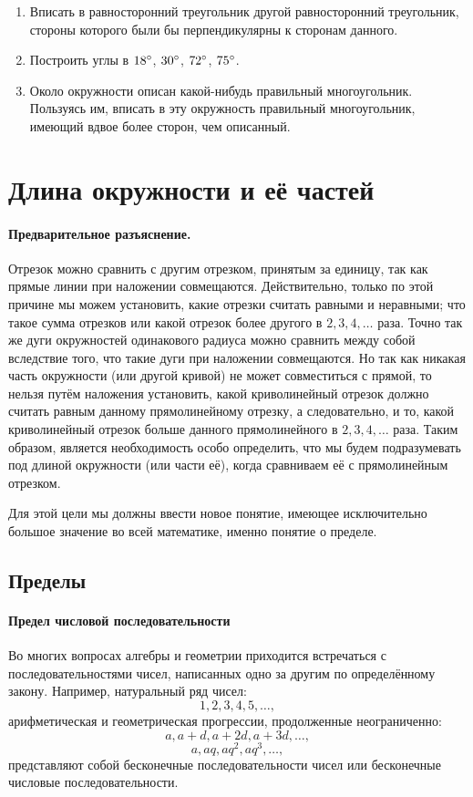 \documentclass[twoside]{book}
\begin{document}
\begin{enumerate}
 \item
Вписать в равносторонний треугольник другой равносторонний треугольник, стороны которого были бы перпендикулярны к сторонам данного.

 \item
Построить углы в $18\degree$, $30\degree$, $72\degree$, $75\degree$.

\item
Около окружности описан какой-нибудь правильный многоугольник.
Пользуясь им, вписать в эту окружность правильный многоугольник, имеющий вдвое более сторон, чем описанный.

\end{enumerate}

\section{Длина окружности и её частей}

\paragraph{Предварительное разъяснение.}\label{1938/226}
Отрезок можно сравнить с другим отрезком, принятым за единицу, так как прямые линии при наложении совмещаются.
Действительно, только по этой причине мы можем установить, какие отрезки считать равными и неравными;
что такое сумма отрезков или какой отрезок более другого в $2, 3, 4,\dots$ раза.
Точно так же дуги окружностей одинакового радиуса можно сравнить между собой вследствие того, что такие дуги при наложении совмещаются.
Но так как никакая часть окружности (или другой кривой) не может совместиться с прямой, то нельзя путём наложения установить, какой криволинейный отрезок должно считать равным данному прямолинейному отрезку, а следовательно, и то, какой криволинейный отрезок больше данного прямолинейного в $2,3,4,\dots$
раза.
Таким образом, является необходимость особо определить, что мы будем подразумевать под длиной окружности (или части её), когда сравниваем её с прямолинейным отрезком.

Для этой цели мы должны ввести новое понятие, имеющее исключительно большое значение во всей математике, именно понятие о пределе.

\subsection*{Пределы}

\paragraph{Предел числовой последовательности}\label{1938/227}
Во многих вопросах алгебры и геометрии приходится встречаться с последовательностями чисел, написанных одно за другим по определённому закону.
Например, натуральный ряд чисел:
\[1, 2, 3, 4, 5,\dots,\]
арифметическая и геометрическая прогрессии, продолженные неограниченно:
\[a,a+d,a+2d,a+3d,\dots,\]
\[a,aq,aq^2,aq^3,\dots,\]
представляют собой бесконечные последовательности чисел или бесконечные числовые последовательности.
\end{document}
